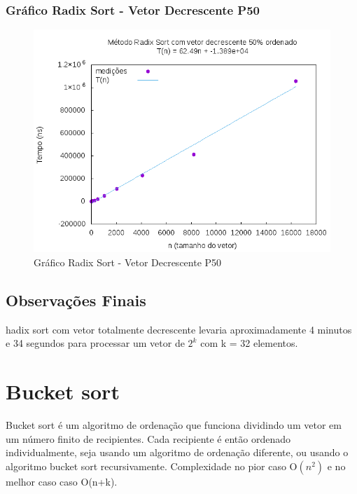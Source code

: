 \documentclass[12pt,a4paper,twoside]{report}
\begin{document}
\subsection{Gráfico Radix Sort - Vetor Decrescente P50}
\begin{figure}[H]
    \centering
    \includegraphics[width=0.7\linewidth]{graficos/RadixSort/vIntDecrescenteP50/vIntDecrescenteP50.png}
  \caption{Gráfico Radix Sort - Vetor Decrescente P50}
\end{figure}
\section{Observações Finais}
hadix sort com vetor totalmente decrescente levaria aproximadamente 4 minutos e 34 segundos para processar um vetor de $2^k$ com k = 32 elementos.

\chapter{Bucket sort}
Bucket sort é um algoritmo de ordenação que funciona dividindo um vetor em um número finito de recipientes. Cada recipiente é então ordenado individualmente, seja usando um algoritmo de ordenação diferente, ou usando o algoritmo bucket sort recursivamente. Complexidade no pior caso O$(n^2)$ e no melhor caso caso O(n+k).
\end{document}
